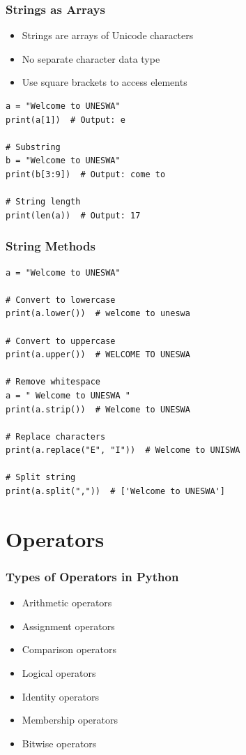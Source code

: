 \documentclass[aspectratio=169]{beamer}
\begin{document}
\begin{frame}[fragile]
\frametitle{Strings as Arrays}
\begin{itemize}
\item Strings are arrays of Unicode characters
\item No separate character data type
\item Use square brackets to access elements
\end{itemize}

\begin{lstlisting}
a = "Welcome to UNESWA"
print(a[1])  # Output: e

# Substring
b = "Welcome to UNESWA"
print(b[3:9])  # Output: come to

# String length
print(len(a))  # Output: 17
\end{lstlisting}
\end{frame}

\begin{frame}[fragile]
\frametitle{String Methods}
\begin{lstlisting}
a = "Welcome to UNESWA"

# Convert to lowercase
print(a.lower())  # welcome to uneswa

# Convert to uppercase
print(a.upper())  # WELCOME TO UNESWA

# Remove whitespace
a = " Welcome to UNESWA "
print(a.strip())  # Welcome to UNESWA

# Replace characters
print(a.replace("E", "I"))  # Welcome to UNISWA

# Split string
print(a.split(","))  # ['Welcome to UNESWA']
\end{lstlisting}
\end{frame}

\section{Operators}

\begin{frame}
\frametitle{Types of Operators in Python}
\begin{itemize}
\item Arithmetic operators
\item Assignment operators
\item Comparison operators
\item Logical operators
\item Identity operators
\item Membership operators
\item Bitwise operators
\end{itemize}
\end{frame}
\end{document}
